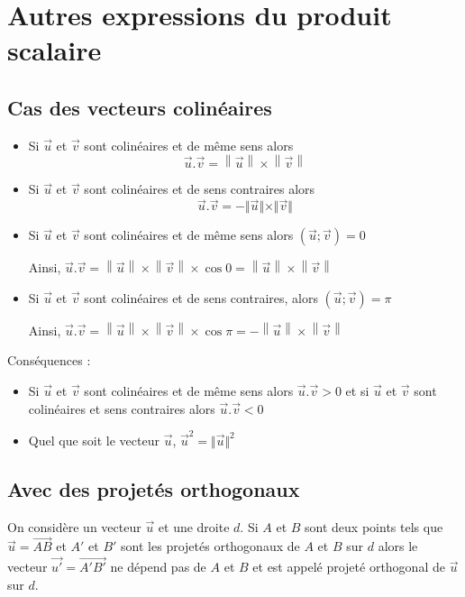 \documentclass[french]{book}
\newcommand{\vect}[1]{\overrightarrow{#1}}
\begin{document}
\section{Autres expressions du produit scalaire}
\subsection{Cas des vecteurs colin\'eaires}
\begin{prop}
\begin{itemize}
\item Si $\vect{u}$ et $\vect{v}$ sont colin\'eaires et de m\^eme sens alors
\[\vect{u}.\vect{v}=\left\|\vect{u}\right\|\times \left\|\vect{v}\right\|\]
\item Si $\vect{u}$ et $\vect{v}$ sont colin\'eaires et de sens contraires alors \[\vect{u}.\vect{v}=-\Vert\vect{u}\Vert\times \Vert\vect{v}\Vert\]
\end{itemize}
\end{prop}

\begin{demo}
\begin{itemize}
\item Si $\vect{u}$ et $\vect{v}$ sont colin\'eaires et de m\^eme sens alors $\left(\vect{u};\vect{v}\right)=0$

Ainsi, $\vect{u}.\vect{v}=\left\|\vect{u}\right\|\times \left\|\vect{v}\right\|\times \cos0 = \left\|\vect{u}\right\| \times \left\|\vect{v}\right\|$

\item Si $\vect{u}$ et $\vect{v}$ sont colin\'eaires et de sens contraires, alors $\left(\vect{u};\vect{v}\right)=\pi$

Ainsi, $\vect{u}.\vect{v}=\left\|\vect{u}\right\|\times \left\|\vect{v}\right\|\times \cos\pi = -\left\|\vect{u}\right\| \times \left\|\vect{v}\right\|$
\end{itemize}
\end{demo}

Cons\'equences :
\begin{itemize}
 \item Si $\vect{u}$ et $\vect{v}$ sont colin\'eaires et de m\^eme sens alors $\vect{u}.\vect{v}>0$ et si $\vect{u}$ et $\vect{v}$ sont colin\'eaires et sens contraires alors $\vect{u}.\vect{v}<0$
 \item Quel que soit le vecteur $\vect{u}$, $\vect{u}^{2}=\Vert\vect{u}\Vert^{2}$
\end{itemize}

%
\subsection{Avec des projet\'es orthogonaux}
\begin{defn}
 On consid\`ere un vecteur $\vect{u}$ et une droite $d$. Si $A$ et $B$ sont deux points tels que $\vect{u}=\vect{AB}$ et $A'$ et $B'$ sont les projet\'es orthogonaux de $A$ et $B$ sur $d$ alors le vecteur $\vect{u'}=\vect{A'B'}$ ne d\'epend pas de $A$ et $B$ et est appel\'e projet\'e orthogonal de $\vect{u}$ sur $d$.
\end{defn}
\end{document}
